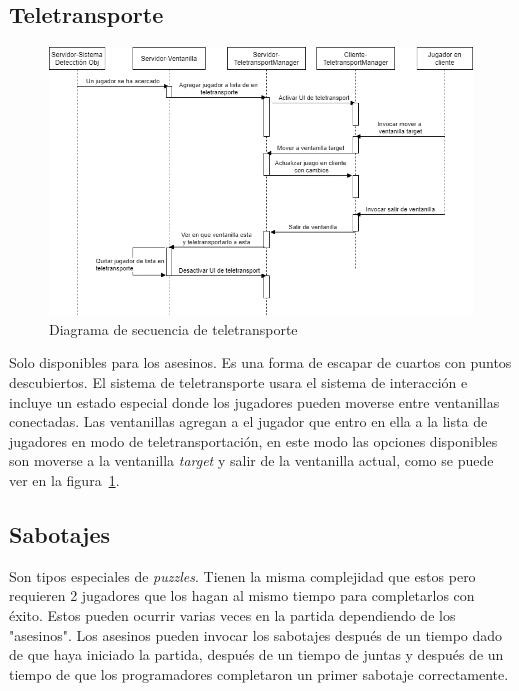 \subsection{Teletransporte}
\begin{figure}[h]
    \centering
    \includegraphics[width=1\linewidth]{images/DiagramaSecuenciaTeletransporte.png}
    \caption{Diagrama de secuencia de teletransporte}
    \label{fig:diagrama_sec_teletransporte}
\end{figure}
Solo disponibles para los asesinos. Es una forma de escapar de cuartos con puntos descubiertos. El sistema de teletransporte usara el sistema de interacción e incluye un estado especial donde los jugadores pueden moverse entre ventanillas conectadas. Las ventanillas agregan a el jugador que entro en ella a la lista de jugadores en modo de teletransportación, en este modo las opciones disponibles son moverse a la ventanilla \textit{target} y salir de la ventanilla actual, como se puede ver en la figura~\ref{fig:diagrama_sec_teletransporte}.

\subsection{Sabotajes}
Son tipos especiales de \textit{puzzles}. Tienen la misma complejidad que estos pero requieren 2 jugadores que los hagan al mismo tiempo para completarlos con éxito. Estos pueden ocurrir varias veces en la partida dependiendo de los "asesinos". Los asesinos pueden invocar los sabotajes después de un tiempo dado de que haya iniciado la partida, después de un tiempo de juntas y después de un tiempo de que los programadores completaron un primer sabotaje correctamente.

